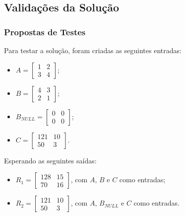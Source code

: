 \documentclass{beamer}
\begin{document}
    \subsection{Validações da Solução}
    \begin{frame}
        \frametitle{Propostas de Testes}

        \begingroup {}
        Para testar a solução, foram criadas as seguintes entradas:

        \begin{itemize}
            \item $ A = \begin{bmatrix} 1 & 2 \\ 3 & 4 \end{bmatrix} $;
            \item $ B = \begin{bmatrix} 4 & 3 \\ 2 & 1 \end{bmatrix} $;
            \item $ B_{NULL} = \begin{bmatrix} 0 & 0 \\ 0 & 0 \end{bmatrix} $;
            \item $ C = \begin{bmatrix} 121 & 10 \\ 50 & 3 \end{bmatrix} $.
        \end{itemize}
        \endgroup

        \begingroup {}
        Esperando as seguintes saídas:
        \begin{itemize} 
            \item $ R_1 = \begin{bmatrix} 128 & 15 \\ 70 & 16 \end{bmatrix} $,
                  com $ A $, $ B $ e $ C $ como entradas;
            \item $ R_2 = \begin{bmatrix} 121 & 10 \\ 50 & 3 \end{bmatrix} $,
                  com $ A $, $ B_{NULL} $ e $ C $ como entradas.
        \end{itemize}
        \endgroup

    \end{frame}
\end{document}
